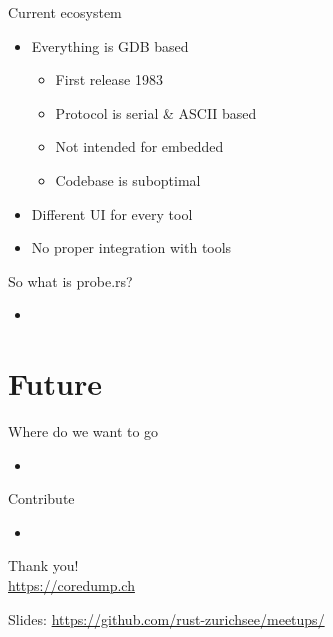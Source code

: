 \documentclass[aspectratio=1610,14pt,t]{beamer}
\begin{document}
\begin{frame}[c]{Current ecosystem}
  \begin{itemize}
    \item Everything is GDB based
      \begin{itemize}
        \item First release 1983
        \item Protocol is serial \& ASCII based
        \item Not intended for embedded
        \item Codebase is suboptimal
      \end{itemize}
    \item Different UI for every tool
    \item No proper integration with tools
  \end{itemize}
\end{frame}

\begin{frame}[c]{So what is probe.rs?}
  \begin{itemize}
    \item 
  \end{itemize}
\end{frame}

\section{Future}

\begin{frame}[c]{Where do we want to go}
  \begin{itemize}
    \item
  \end{itemize}
\end{frame}

\begin{frame}[c]{Contribute}
  \begin{itemize}
    \item
  \end{itemize}
\end{frame}


{
\begin{frame}[standout]
  \begin{centering}
    {\Huge Thank you!}\\
    {\normalsize \url{https://coredump.ch}}\\
  \end{centering}
  {\small Slides: \url{https://github.com/rust-zurichsee/meetups/}}\\
  \vspace{3cm}
\end{frame}
}
\end{document}
